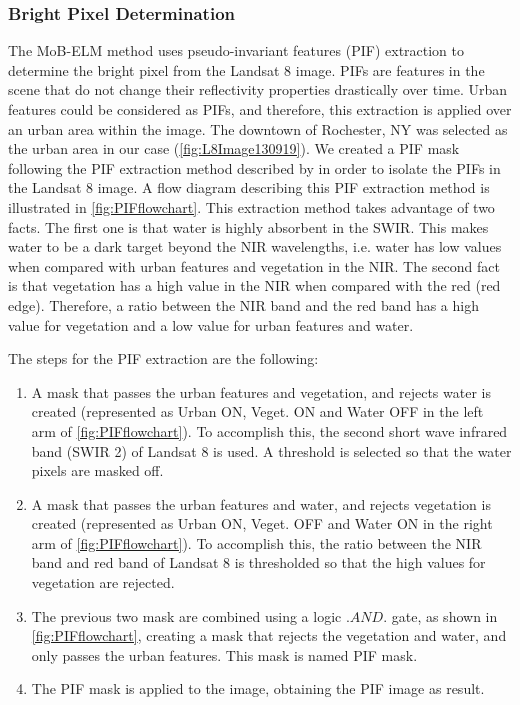 \documentclass[onecolumn,3p,letterpaper]{elsarticle}
\begin{document}
\subsubsection{Bright Pixel Determination}

The MoB-ELM method uses pseudo-invariant features (PIF) extraction to determine the bright pixel from the Landsat 8 image. PIFs are features in the scene that do not change their reflectivity properties drastically over time. Urban features could be considered as PIFs, and therefore, this extraction is applied over an urban area within the image. The downtown of Rochester, NY was selected as the urban area in our case (\autoref{fig:L8Image130919}). We created a PIF mask following the PIF extraction method described by \cite{Schott:1988} in order to isolate the PIFs in the Landsat 8 image. A flow diagram describing this PIF extraction method is illustrated in \autoref{fig:PIFflowchart}. This extraction method takes advantage of two facts. The first one is that water is highly absorbent in the SWIR. This makes water to be a dark target beyond the NIR wavelengths, i.e. water has low values when compared with urban features and vegetation in the NIR. The second fact is that vegetation has a high value in the NIR when compared with the red (red edge). Therefore, a ratio between the NIR band and the red band has a high value for vegetation and a low value for urban features and water. 

The steps for the PIF extraction are the following:
\begin{enumerate}\itemsep10pt
	\item A mask that passes the urban features and vegetation, and rejects water is created (represented as Urban ON, Veget. ON and Water OFF in the left arm of \autoref{fig:PIFflowchart}). To accomplish this, the second short wave infrared band (SWIR 2) of Landsat 8 is used. A threshold is selected so that the water pixels are masked off.
	\item A mask that passes the urban features and water, and rejects vegetation is created (represented as Urban ON, Veget. OFF and Water ON in the right arm of \autoref{fig:PIFflowchart}). To accomplish this, the ratio between the NIR band and red band of Landsat 8 is thresholded so that the high values for vegetation are rejected.
	\item The previous two mask are combined using a logic $.AND.$ gate, as shown in \autoref{fig:PIFflowchart}, creating a mask that rejects the vegetation and water, and only passes the urban features. This mask is named PIF mask.
	\item The PIF mask is applied to the image, obtaining the PIF image as result.

\end{enumerate}
\end{document}

